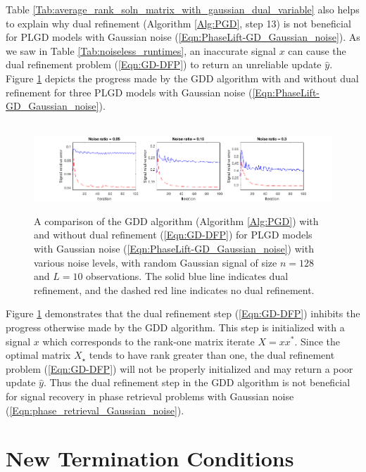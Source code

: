 Table \ref{Tab:average_rank_soln_matrix_with_gaussian_dual_variable} also helps to explain why dual refinement (Algorithm \ref{Alg:PGD}, step 13) is not beneficial for PLGD models with Gaussian noise (\ref{Eqn:PhaseLift-GD_Gaussian_noise}).  As we saw in Table \ref{Tab:noiseless_runtimes}, an inaccurate signal $x$ can cause the dual refinement problem (\ref{Eqn:GD-DFP}) to return an unreliable update $\hat{y}$.  Figure \ref{Fig:noisy_random_DFP_vs_no_DFP} depicts the progress made by the GDD algorithm with and without dual refinement for three PLGD models with Gaussian noise (\ref{Eqn:PhaseLift-GD_Gaussian_noise}).

\begin{figure}[H]
\hbox{\hspace{-1.0cm}  \includegraphics[scale=0.6]{noisy_random_signal_DFP_vs_no_DFP}}
\caption{A comparison of the GDD algorithm (Algorithm \ref{Alg:PGD}) with and without dual refinement (\ref{Eqn:GD-DFP}) for PLGD models with Gaussian noise (\ref{Eqn:PhaseLift-GD_Gaussian_noise}) with various noise levels, with random Gaussian signal of size $n = 128$ and $L = 10$ observations.  The solid blue line indicates dual refinement, and the dashed red line indicates no dual refinement.}
\label{Fig:noisy_random_DFP_vs_no_DFP}
\end{figure}



Figure \ref{Fig:noisy_random_DFP_vs_no_DFP} demonstrates that the dual refinement step (\ref{Eqn:GD-DFP})  inhibits the progress otherwise made by the GDD algorithm.  This step is initialized with a signal $x$ which corresponds to the rank-one matrix iterate $X = xx^*$.  Since the optimal matrix $X_\star$ tends to have rank greater than one, the dual refinement problem (\ref{Eqn:GD-DFP}) will not be properly initialized and may return a poor update $\hat{y}$.  Thus the dual refinement step in the GDD algorithm is not beneficial for signal recovery in phase retrieval problems with Gaussian noise (\ref{Eqn:phase_retrieval_Gaussian_noise}).





\section{New Termination Conditions}  	\label{Subsec:PLGD_term_crit-new_term_crit}


